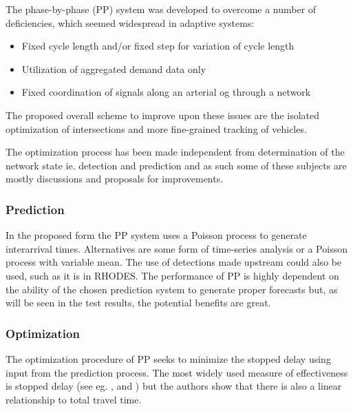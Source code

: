 The phase-by-phase (PP) system was developed to overcome a number of
deficiencies, which seemed widespread in adaptive systems:

\begin{itemize}
\item Fixed cycle length and/or fixed step for variation of cycle length
\item Utilization of aggregated demand data only
\item Fixed coordination of signals along an arterial og through a network
\end{itemize}

The proposed overall scheme to improve upon these issues are the
isolated optimization of intersections and more fine-grained tracking
of vehicles.

The optimization process has been made independent from determination
of the network state ie. detection and prediction and as such some of
these subjects are mostly discussions and proposals for improvements.

\subsubsection*{Prediction}

In the proposed form the PP system uses a Poisson process to generate
interarrival times.  Alternatives are some form of time-series
analysis or a Poisson process with variable mean. The use of
detections made upstream could also be used, such as it is in RHODES.
The performance of PP is highly dependent on the ability of the chosen
prediction system to generate proper forecasts but, as will be seen in
the test results, the potential benefits are great.

\subsubsection*{Optimization}

The optimization procedure of PP seeks to minimize the stopped delay
using input from the prediction process. The most widely used measure
of effectiveness is stopped delay (see eg. \cite{9}, \cite{38} and
\cite{31}) but the authors show that there is also a linear
relationship to total travel time.

